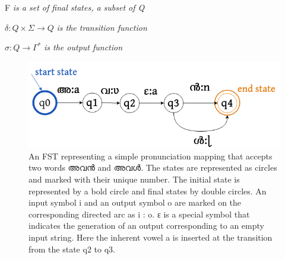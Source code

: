 \documentclass{ieeeaccess}
\begin{document}
F \textit{is a set of final states,  a subset of Q}

$\delta  : Q × \Sigma → Q $ \textit{is the transition function}

$\sigma  : Q → \Gamma^* $ \textit{is the output function}



\begin{figure}[h]
	\centering
	\includegraphics[width=\linewidth]{egfst.png}
	\caption{An FST representing a simple pronunciation mapping that accepts two words {\mal അവൻ} and {\mal  അവൾ}. The states are represented as circles and marked with their unique number. The initial state is represented by a bold circle and final states by double circles. An input symbol i and an output symbol o are marked on the corresponding directed arc as i : o. {\ipa ɛ} is a special symbol that indicates the generation of an output corresponding to an empty input string. Here the inherent vowel {\ipa a} is inserted at the transition from the state q2 to q3.}
	\label{egfst}
\end{figure}
\end{document}

